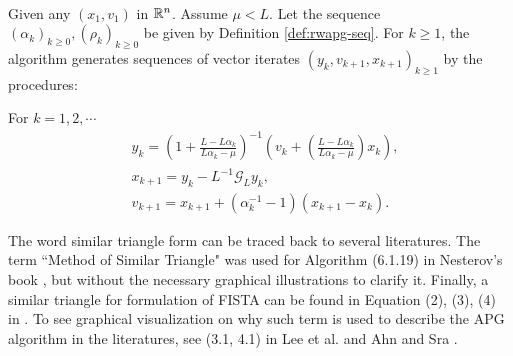 \documentclass[12pt]{article}
\begin{document}
        \begin{definition}\label{def:r-wapg-st-form} \; \\
            Given any $(x_1, v_1)$ in $\mathbb R^n$. 
            Assume $\mu < L$.
            Let the sequence $(\alpha_k)_{k \ge 0}, (\rho_k)_{k\ge 0}$ be given by Definition \ref{def:rwapg-seq}. 
            For $k \ge 1$, the algorithm generates sequences of vector iterates $(y_k, v_{k + 1}, x_{k + 1})_{k \ge 1}$ by the procedures: 
            \begin{tcolorbox}
                For $k=1, 2, \cdots $
                \begin{align*}
                    & y_k = 
                    \left(
                        1 + \frac{L - L\alpha_k}{L\alpha_k - \mu}
                    \right)^{-1}
                    \left(
                        v_k + 
                        \left(\frac{L - L\alpha_k}{L\alpha_k - \mu} \right) x_k
                    \right), 
                    \\
                    & x_{k + 1} = 
                    y_k - L^{-1} \mathcal G_L y_k, 
                    \\
                    & v_{k + 1} = 
                    x_{k + 1} + (\alpha_k^{-1} -1)(x_{k + 1} - x_k). 
                \end{align*}    
            \end{tcolorbox}
        \end{definition}
        \begin{remark}
            The word similar triangle form can be traced back to several literatures. 
            The term ``Method of Similar Triangle" was used for Algorithm (6.1.19) in Nesterov's book \cite{nesterov_lectures_2018}, but without the necessary graphical illustrations to clarify it. 
            Finally, a similar triangle for formulation of FISTA can be found in Equation (2), (3), (4) in \cite{chambolle_convergence_2015}. 
            To see graphical visualization on why such term is used to describe the APG algorithm in the literatures, see (3.1, 4.1) in Lee et al. \cite{lee_geometric_2021} and Ahn and Sra \cite{ahn_understanding_2022}. 

        \end{remark}
\end{document}
